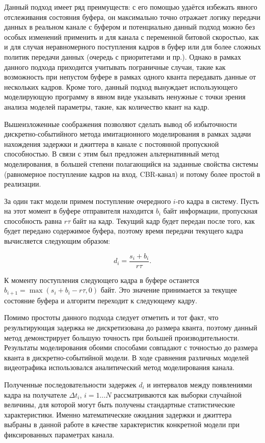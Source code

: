 Данный подход имеет ряд преимуществ: с его помощью удаётся
избежать явного отслеживания состояния буфера,
он максимально точно отражает логику передачи данных в реальном
канале с буфером и потенциально данный подход можно
без особых изменений применить и для канала с переменной
битовой скоростью, как и для случая неравномерного поступления
кадров в буфер или для более сложных политик передачи данных
(очередь с приоритетами и пр.). Однако в рамках данного подхода приходится
учитывать пограничные случаи, такие как возможность при
непустом буфере в рамках одного кванта передавать
данные от нескольких кадров. Кроме того, данный подход вынуждает
использующего моделирующую программу в явном виде указывать
ненужные с точки зрения анализа моделей параметры, такие,
как количество квант на кадр.

Вышеизложенные соображения позволяют сделать вывод об
избыточности дискретно-событийного метода имитационного
моделирования в рамках задачи нахождения задержки
и джиттера в канале с постоянной пропускной способностью.
В связи с этим был предложен альтернативный метод
моделирования, в большей степени полагающийся на
заданные свойства системы (равномерное поступление
кадров на вход, CBR-канал) и потому более простой
в реализации.

За один такт модели примем поступление очередного
$i$-го кадра в систему. Пусть на этот момент в
буфере отправителя находится $b_i$ байт информации,
пропускная способность равна $r\tau$ байт на кадр.
Текущий кадр будет передан после того, как будет
передано содержимое буфера, поэтому время передачи
текущего кадра вычисляется следующим образом:

\begin{equation}
    d_i = \frac{s_i + b_i}{r\tau}.
\end{equation}

К моменту поступления следующего кадра в буфере
останется $b_{i+1} = \max(s_i + b_i - r\tau, 0)$
байт. Это значение принимается за текущее состояние
буфера и алгоритм переходит к следующему кадру.

Помимо простоты данного подхода следует отметить и
тот факт, что результирующая задержка не дискретизована
до размера кванта, поэтому данный метод демонстрирует
большую точность при большей производительности.
Результаты моделирования обоими способами совпадают
с точностью до размера кванта в дискретно-событийной модели.
В ходе сравнения различных моделей видеотрафика использовался
аналитический метод моделирования канала.

Полученные последовательности задержек $d_i$ и интервалов
между появлениями кадра на получателе $\Delta t_i$, $i = 1 \dots N$
рассматриваются как выборки случайной величины, для которой
могут быть получены стандартные статистические характеристики.
Именно математические ожидания задержки и джиттера выбраны
в данной работе в качестве характеристик
конкретной модели при фиксированных параметрах канала.
